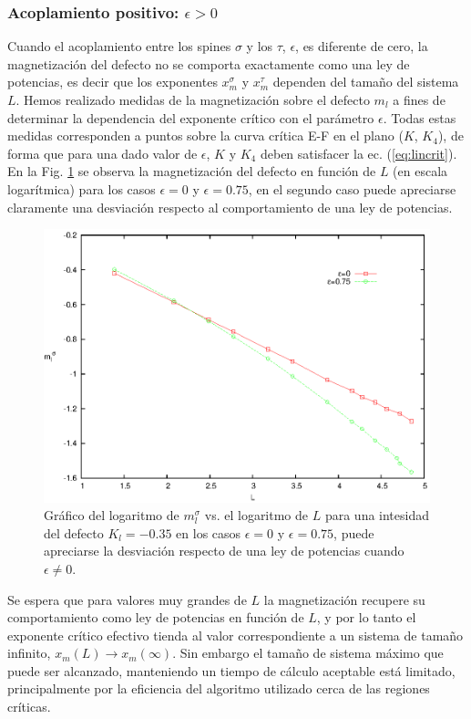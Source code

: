 \subsubsection{Acoplamiento positivo: $\epsilon>0$}

Cuando el acoplamiento entre los spines $\sigma$ y los $\tau$, $\epsilon$, es diferente de cero, la magnetización del defecto
 no se comporta exactamente como una ley de potencias, es decir que los exponentes $x_{m}^{\sigma}$ y $x_{m}^{\tau}$ dependen del
 tamaño del sistema $L$. Hemos realizado medidas de la magnetizaci\'on sobre el defecto $m_{l}$ a fines de determinar la dependencia del
 exponente cr\'itico con el par\'ametro $\epsilon$. Todas estas medidas corresponden a puntos sobre la curva cr\'itica E-F
 en el plano ($K$, $K_{4}$), de forma que para una dado valor de $\epsilon$, $K$ y $K_{4}$ deben satisfacer la ec. (\ref{eq:lincrit}).
 En la Fig. \ref{fig:desv} se observa la magnetización del defecto en función de $L$ (en escala logar\'itmica) para los casos
 $\epsilon=0$ y $\epsilon=0.75$, en el segundo caso puede apreciarse claramente una desviación respecto al comportamiento de una ley de potencias.

\begin{figure}[h!]
\begin{center}
\includegraphics[width=\figwidth]{graf/exp/desv_e0.75_vs_e0.eps}
\end{center}
\caption{Gráfico del logaritmo de $m_{l}^{\sigma}$ vs. el logaritmo de $L$ para una intesidad del defecto $K_{l}=-0.35$ en
 los casos $\epsilon=0$ y $\epsilon=0.75$, puede apreciarse la desviación respecto de una ley de potencias cuando $\epsilon\neq 0$.}
\label{fig:desv}
\end{figure}
Se espera que para valores muy grandes de $L$ la magnetización recupere su comportamiento como ley de potencias en función
 de $L$, y por lo tanto el exponente crítico efectivo tienda al valor correspondiente a un sistema de tamaño infinito,
 $x_{m}(L)\rightarrow x_{m}(\infty)$. Sin embargo el tamaño de sistema m\'aximo que puede ser alcanzado, manteniendo un tiempo de c\'alculo
 aceptable est\'a limitado, principalmente por la eficiencia del algoritmo utilizado cerca de las regiones cr\'iticas.
 
